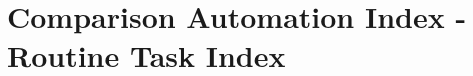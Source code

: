\documentclass[11pt,a4paper]{article}
\newcommand*{\myalign}[2]{\multicolumn{1}{#1}{#2}} %
\begin{document}
\begin{comment}
\begin{table}
\begin{small}
  \begin{threeparttable}
    \caption{{\normalsize Examples of matched industries with patents, 2001}}
    \label{table:industry_linked2matches2001}
     \begin{tabular}{llr}
        \toprule
        \textbf{NAICS} & \textbf{Industry name} & \textbf{Number matches}  \tabularnewline
        \midrule
        334413	& Semiconductor and Related Device Manufacturing  & 6'867							\tabularnewline
        511219 	& Other Computer Related Services$^1$				& 6'418									\tabularnewline
        541512 	& Computer Systems Design Services				& 5'692									\tabularnewline
        \myalign{c}{\vdots}	& \myalign{c}{\vdots}			& 		\myalign{r}{\vdots}							\tabularnewline
        3335 	& Motor Vehicle Parts Manufacturing				& 2									\tabularnewline
        3363 	& Metalworking Machinery Manufacturing				& 1									\tabularnewline
        \myalign{c}{\vdots}	& \myalign{c}{\vdots}			& 		\myalign{r}{\vdots}							\tabularnewline
        3112 	& Grain and Oilseed Milling				& 0									\tabularnewline
        \myalign{c}{\vdots}	& \myalign{c}{\vdots}			& 		\myalign{r}{\vdots}							\tabularnewline
        \midrule
        	& Mean matches per industry  & 200.1							\tabularnewline
        	& Total matches linked to industries  & 94'046							\tabularnewline
        	& Total number of matches  & 231'514							\tabularnewline
        	& Share of matches linked to industries  & 41\%							\tabularnewline
        	& Total number of patents identified  & 184'172							\tabularnewline
        \bottomrule
     \end{tabular}
    \begin{tablenotes}
      \footnotesize
      \item $^1$includes software installation services and computer disaster recovery services 
      \item 	\textit{Source:} USPTO, Google and own calculations.
          \end{tablenotes}
  \end{threeparttable}
\end{small}
\end{table}
\end{comment}

\section{Comparison Automation Index - Routine Task Index}
\end{document}
